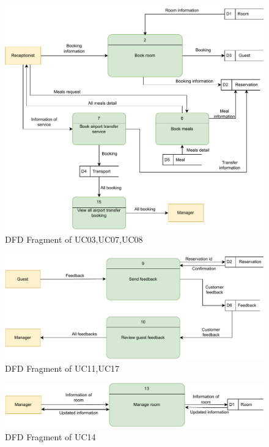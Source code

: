 \begin{figure}[H]
    \includegraphics[width=1\linewidth]{img/dfd2.pdf}
    \caption{DFD Fragment of UC03,UC07,UC08}
    \label{fig:DFD Fragment of UC03,UC07,UC08}
\end{figure}
\begin{figure}[H]
    \includegraphics[width=1\linewidth]{img/dfd3.pdf}
    \caption{DFD Fragment of UC11,UC17}
    \label{fig:DFD Fragment of UC11,UC17}
\end{figure}
\begin{figure}[H]
    \includegraphics[width=1\linewidth]{img/dfd4.pdf}
    \caption{DFD Fragment of UC14}
    \label{fig:DFD Fragment of UC14}
\end{figure}
